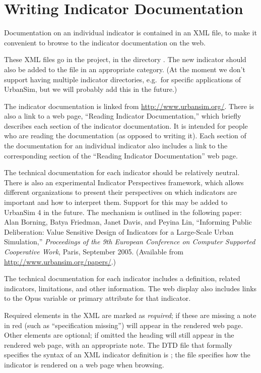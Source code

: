 \section{Writing Indicator Documentation}
\label{sec:writing-indicators}

Documentation on an individual indicator is contained in an XML file, to
make it convenient to browse to the indicator documentation on the web.

These XML files go in the  project, in the directory
.  The new indicator should also be added
to the  file in an appropriate category.
(At the moment we don't support having multiple indicator directories,
e.g.\ for specific applications of UrbanSim, but we will probably add this
in the future.)

The indicator documentation is
linked from \url{http://www.urbansim.org/}.  There is also a link
to a web page, ``Reading Indicator Documentation,'' which briefly describes
each section of the indicator documentation.  It is intended for people who
are reading the documentation (as opposed to writing it).
Each section of the documentation for an individual indicator
also includes a link to the corresponding section of the ``Reading
Indicator Documentation'' web page.

The technical documentation for each indicator should be relatively neutral.  There is also
an experimental Indicator Perspectives framework, which allows different organizations
to present their perspectives on which indicators are important and how to interpret
them.  Support for this may be added to UrbanSim 4 in the future.  The mechanism is
outlined in the following paper:
Alan Borning, Batya Friedman, Janet Davis, and Peyina Lin,
``Informing Public Deliberation: Value Sensitive Design of Indicators for a
Large-Scale Urban Simulation,'' \emph{Proceedings of the 9th European
Conference on Computer Supported Cooperative Work}, Paris, September 2005.  (Available
from \url{http://www.urbansim.org/papers/}.)

The technical documentation for each indicator includes a definition,
related indicators, limitations, and other information.  The web display
also includes links to the Opus variable or primary attribute for that
indicator.

Required elements in the XML are marked as \emph{required}; if these
are missing a note in red (such as ``specification missing'') will
appear in the rendered web page. Other elements are optional; if
omitted the heading will still appear in the rendered web page, with
an appropriate note. The DTD file that formally specifies the syntax
of an XML indicator definition is ;
the file  specifies how the indicator is
rendered on a web page when browsing.

